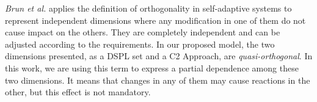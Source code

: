 \textit{Brun et al.}\cite{SAS02} applies the definition of orthogonality in self-adaptive systems to represent independent dimensions where any modification in one of them do not cause impact on the others. They are completely independent and can be adjusted according to the requirements. In our proposed model, the two dimensions presented, as a DSPL set and a C2 Approach, are \textit{quasi-orthogonal}. In this work, we are using this term to express a partial dependence among these two dimensions. It means that changes in any of them may cause reactions in the other, but this effect is not mandatory.
